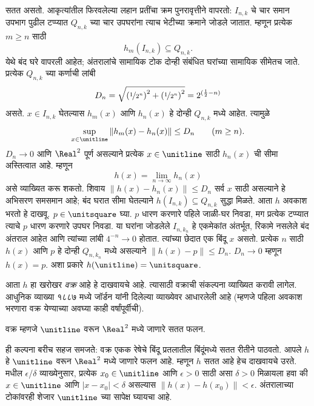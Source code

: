 \documentclass[../../../include/open-logic-section]{subfiles}
\begin{document}
सतत असतो.
आकृत्यांतील फिरवलेल्या लहान प्रतींचा क्रम पुनरावृत्तीने
वापरतो: $I_{n,k}$ चे चार समान उपभाग पुढील टप्प्यात
$Q_{n,k}$ च्या चार उपघरांना त्याच भेटीच्या क्रमाने
जोडले जातात. म्हणून प्रत्येक $m\geq n$ साठी
\[
h_m(I_{n,k})\subseteq Q_{n,k}.
\]
येथे बंद घरे वापरली आहेत; अंतरालांचे सामायिक टोक दोन्ही
संबंधित घरांच्या सामायिक सीमेतच जाते.
प्रत्येक $Q_{n,k}$ च्या कर्णाची लांबी
\[
D_n=\sqrt{\left(\nicefrac{1}{2^{n}}\right)^2+
\left(\nicefrac{1}{2^{n}}\right)^2}
=2^{(\frac{1}{2}-n)}
\]
असते. $x\in I_{n,k}$ घेतल्यास $h_m(x)$ आणि $h_n(x)$
हे दोन्ही $Q_{n,k}$ मध्ये आहेत. त्यामुळे
\[
\sup_{x\in\unitline}\|h_m(x)-h_n(x)\|\leq D_n
\qquad(m\geq n).
\]
$D_n\to0$ आणि $\Real^2$ पूर्ण असल्याने प्रत्येक
$x\in\unitline$ साठी $h_n(x)$ ची सीमा अस्तित्वात आहे.
म्हणून
\[
h(x)=\lim_{n\to\infty}h_n(x)
\]
असे व्याख्यित करू शकतो. शिवाय
$\|h(x)-h_n(x)\|\leq D_n$ सर्व $x$ साठी असल्याने
हे अभिसरण समसमान आहे; बंद घरात सीमा घेतल्याने
$h(I_{n,k})\subseteq Q_{n,k}$ सुद्धा मिळते.
आता $h$ अवकाश भरतो हे दाखवू. $p\in\unitsquare$ घ्या.
$p$ धारण करणारे पहिले जाळी-घर निवडा, मग प्रत्येक
टप्प्यात त्याचे $p$ धारण करणारे उपघर निवडा. या
घरांना जोडलेले $I_{n,k_n}$ हे एकमेकांत अंतर्भूत,
रिकामे नसलेले बंद अंतराल आहेत आणि त्यांच्या लांबी
$4^{-n}\to0$ होतात. त्यांच्या छेदात एक बिंदू $x$
असतो. प्रत्येक $n$ साठी $h(x)$ आणि $p$ हे दोन्ही
$Q_{n,k_n}$ मध्ये असल्याने $\|h(x)-p\|\leq D_n$.
$D_n\to0$ म्हणून $h(x)=p$. अशा प्रकारे
$h(\unitline)=\unitsquare$.

आता $h$ हा खरोखर \emph{वक्र} आहे हे दाखवायचे आहे. त्यासाठी वक्राची संकल्पना व्याख्यित करावी लागेल. आधुनिक व्याख्या १८८७ मध्ये जॉर्डन यांनी दिलेल्या व्याख्येवर आधारलेली आहे (म्हणजे पहिला अवकाश भरणारा वक्र येण्याच्या अवघ्या काही वर्षांपूर्वीची).

\begin{defn}
वक्र म्हणजे $\unitline$ वरून $\Real^2$ मध्ये जाणारे सतत फलन.
\end{defn}

ही कल्पना बरीच सहज समजते: वक्र एकक रेषेचे बिंदू
प्रतलातील बिंदूंमध्ये सतत रीतीने पाठवतो. आपले $h$ हे
$\unitline$ वरून $\Real^2$ मध्ये जाणारे फलन आहे.
म्हणून $h$ सतत आहे हेच दाखवायचे उरते.
 मधील $\epsilon$/$\delta$ व्याख्येनुसार,
प्रत्येक $x_0\in\unitline$ आणि $\epsilon>0$ साठी
असा $\delta>0$ मिळायला हवा की
$x\in\unitline$ आणि $|x-x_0|<\delta$ असल्यास
$\|h(x)-h(x_0)\|<\epsilon$.
अंतरालाच्या टोकांवरही शेजार $\unitline$ च्या सापेक्ष
घ्यायचा आहे.
\end{document}
